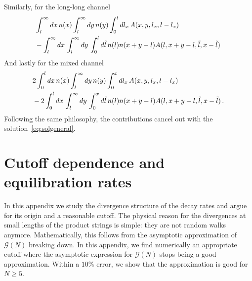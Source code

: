 \documentclass[a4paper,11pt]{article}
\begin{document}
Similarly, for the long-long channel
\begin{equation}
    \begin{split}
    &\int_l^\infty{dx \, n(x)\int_l^\infty{dy \, n(y) \int_0^l{dl_x \, A(x,y,l_x,l-l_x)}}} \\
    &-\int_l^{\infty}{dx\, \int_l^{\infty}{dy \, \int_0^l{d\Tilde{l}\, n(l)n(x+y-l)A(l,x+y-l,\Tilde{l},x-\Tilde{l})}}}\, 
    \end{split}
\end{equation}
And lastly for the mixed channel
\begin{equation}
    \begin{split}
        &2\int_0^l{dx\, n(x) \int_l^\infty{dy \, n(y) \int_0^x{dl_x\, A(x,y,l_x,l-l_x)}}} \\
        &-2\int_0^{l}{dx\, \int_l^{\infty}{dy \, \int_0^x{d\Tilde{l}\, n(l)n(x+y-l)A(l,x+y-l,\Tilde{l},x-\Tilde{l})}}} \, .
    \end{split}
\end{equation}
Following the same philosophy, the contributions cancel out with the solution~\eqref{eq:solgeneral}.

\section{Cutoff dependence and equilibration rates}\label{sec:cutoff}
In this appendix we study the divergence structure of the decay rates and argue for its origin and a reasonable cutoff.
The physical reason for the divergences at small lengths of the product strings is simple: they are not random walks anymore.
Mathematically, this follows from the asymptotic approximation of $\mathcal{G}(N)$ breaking down.
In this appendix, we find numerically an appropriate cutoff where the asymptotic expression for $\mathcal{G}(N)$ stops being a good approximation.
Within a $10\%$ error, we show that the approximation is good for $N\geq 5$.
\end{document}
